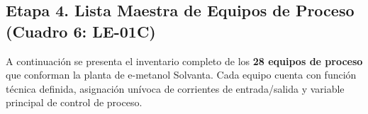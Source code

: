 \documentclass[10pt,letterpaper]{article}
\begin{document}
\begin{landscape}
\section{Etapa 4. Lista Maestra de Equipos de Proceso (Cuadro 6: LE-01C)}

A continuación se presenta el inventario completo de los \textbf{28 equipos de proceso} que conforman la planta de e-metanol Solvanta. Cada equipo cuenta con función técnica definida, asignación unívoca de corrientes de entrada/salida y variable principal de control de proceso.


\end{landscape}
\end{document}
